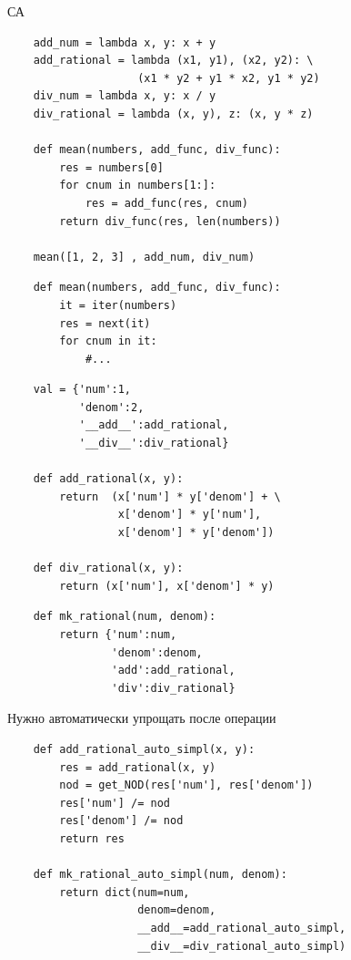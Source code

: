 \documentclass{article}
\begin{document}
\begin{center}  СА \end{center}
\begin{lstlisting}
    add_num = lambda x, y: x + y
    add_rational = lambda (x1, y1), (x2, y2): \
                    (x1 * y2 + y1 * x2, y1 * y2)
    div_num = lambda x, y: x / y
    div_rational = lambda (x, y), z: (x, y * z)

    def mean(numbers, add_func, div_func):
        res = numbers[0]
        for cnum in numbers[1:]:
            res = add_func(res, cnum)
        return div_func(res, len(numbers))

    mean([1, 2, 3] , add_num, div_num)
\end{lstlisting}
\newpage

\begin{lstlisting}
    def mean(numbers, add_func, div_func):
        it = iter(numbers)
        res = next(it)
        for cnum in it:
            #...
\end{lstlisting}
\newpage

\begin{lstlisting}
    val = {'num':1, 
           'denom':2, 
           '__add__':add_rational,
           '__div__':div_rational}

    def add_rational(x, y):
        return  (x['num'] * y['denom'] + \
                 x['denom'] * y['num'], 
                 x['denom'] * y['denom'])

    def div_rational(x, y):
        return (x['num'], x['denom'] * y)
\end{lstlisting}
\newpage

\begin{lstlisting}
    def mk_rational(num, denom):
        return {'num':num, 
                'denom':denom, 
                'add':add_rational, 
                'div':div_rational}
\end{lstlisting}
\newpage

\begin{center} Нужно автоматически упрощать после операции \end{center}
\begin{lstlisting}
    def add_rational_auto_simpl(x, y):
        res = add_rational(x, y)
        nod = get_NOD(res['num'], res['denom'])
        res['num'] /= nod
        res['denom'] /= nod
        return res

    def mk_rational_auto_simpl(num, denom):
        return dict(num=num, 
                    denom=denom, 
                    __add__=add_rational_auto_simpl, 
                    __div__=div_rational_auto_simpl)
\end{lstlisting}
\newpage
\end{document}

